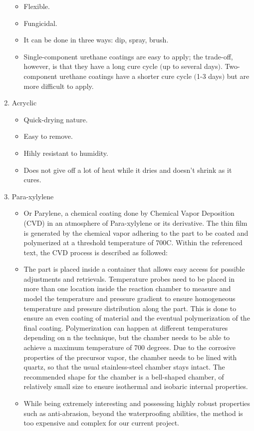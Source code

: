 \documentclass{article}[10pt]
\begin{document}
\begin{enumerate}
\begin{itemize}
              \item Flexible.
              \item Fungicidal.
              \item It can be done in three ways: dip, spray, brush.
              \item Single-component urethane coatings are easy to apply; the trade-off, however, is that they have a long cure cycle $($up to several days$)$. Two-component urethane coatings have a shorter cure cycle $($1-3 days$)$ but are more difficult to apply.
          \end{itemize}
    \item Acryclic
          \begin{itemize}
              \item Quick-drying nature.
              \item Easy to remove.
              \item Hihly resistant to humidity.
              \item Does not give off a lot of heat while it dries and doesn't shrink as it cures.
          \end{itemize}
    \item Para-xylylene
          \begin{itemize}
              \item Or Parylene, a chemical coating done by Chemical Vapor Deposition (CVD) in an atmosphere of Para-xylylene or its derivative. The thin film is generated by the chemical vapor adhering to the part to be coated and polymerized at a threshold temperature of 700C. Within the referenced text, the CVD process is described as followed:
              \item The part is placed inside a container that allows easy access for possible adjustments and retrievals. Temperature probes need to be placed in more than one location inside the reaction chamber to measure and model the temperature and pressure gradient to ensure homogeneous temperature and pressure distribution along the part. This is done to ensure an even coating of material and the eventual polymerization of the final coating. Polymerization can happen at different temperatures depending on n the technique, but the chamber needs to be able to achieve a maximum temperature of 700 degrees. Due to the corrosive properties of the precursor vapor, the chamber needs to be lined with quartz, so that the usual stainless-steel chamber stays intact. The recommended shape for the chamber is a bell-shaped chamber, of relatively small size to ensure isothermal and isobaric internal properties.
              \item While being extremely interesting and possessing highly robust properties such as anti-abrasion, beyond the waterproofing abilities, the method is too expensive and complex for our current project.


\end{itemize}
\end{enumerate}
\end{document}
